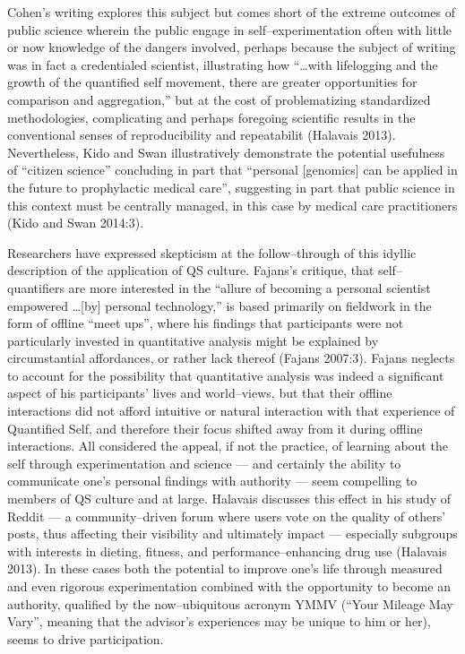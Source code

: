 \documentclass{article}
\begin{document}
Cohen's writing explores this subject but comes short of the extreme outcomes of public science wherein the public engage in self--experimentation often with little or now knowledge of the dangers involved,
perhaps because the subject of writing was in fact a credentialed scientist,
illustrating how ``\dots with lifelogging and the growth of the quantified self movement,
there are greater opportunities for comparison and aggregation,'' but at the cost of problematizing standardized methodologies,
complicating and perhaps foregoing scientific results in the conventional senses of reproducibility and repeatabilit
(Halavais 2013). 
Nevertheless,
Kido and Swan illustratively demonstrate the potential usefulness of ``citizen science'' concluding in part that  ``personal [genomics] can be applied in the future to prophylactic medical care'',
suggesting in part that public science in this context must be centrally managed,
in this case by medical care practitioners
(Kido and Swan 2014:3). 

Researchers have expressed skepticism at the follow--through of this idyllic description of the application of QS culture.
Fajans's critique,
that self--quantifiers are more interested in the ``allure of becoming a personal scientist empowered \dots [by] personal technology,'' is based primarily on fieldwork in the form of offline ``meet ups'',
where his findings that participants were not particularly invested in quantitative analysis might be explained by circumstantial affordances,
or rather lack thereof
(Fajans 2007:3). 
Fajans neglects to account for the possibility that quantitative analysis was indeed a significant aspect of his participants' lives and world--views,
but that their offline interactions did not afford intuitive or natural interaction with that experience of Quantified Self,
and therefore their focus shifted away from it during offline interactions.
All considered the appeal,
if not the practice,
of learning about the self through experimentation and science
--- and certainly the ability to communicate one's personal findings with authority ---
seem compelling to members of QS culture and at large.
Halavais discusses this effect in his study of Reddit
--- a community--driven forum where users vote on the quality of others' posts,
thus affecting their visibility and ultimately impact
--- especially subgroups with interests in dieting,
fitness,
and performance--enhancing drug use
(Halavais 2013). 
In these cases both the potential to improve one's life through measured and even rigorous experimentation combined with the opportunity to become an authority,
qualified by the now--ubiquitous acronym YMMV (``Your Mileage May Vary'',
meaning that the advisor's experiences may be unique to him or her),
seems to drive participation.
\end{document}
